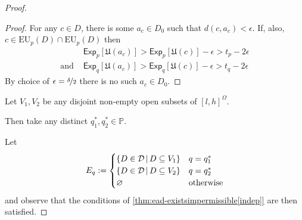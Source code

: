 \documentclass[a4paper,final]{article}
\newcommand\A{\mathcal{A}}
\renewcommand\P{\mathbb{P}} %
\newcommand\Exp{\mathsf{Exp}}
\newcommand\EU{\mathrm{EU}}
\newcommand\U{\mathfrak{U}} %
\newcommand{\Decs}{\mathcal{D}}
\newcommand{\IP}{\P}
\newcommand\SetDelimiter[1][]{
	\nonscript\,#1\vert \allowbreak \nonscript\,\mathopen{}}
\providecommand\given{\SetDelimiter}
\renewcommand{\emptyset}{\varnothing}
\renewcommand{\leq}{\leqslant}
\newenvironment{CCM rewritten}
{\begingroup\color{blue}} %
{\endgroup}              %
\begin{document}
\begin{proof}
\begin{proof}
		For any $c\in D$, there is some $a_c\in D_0$ such that $d(c,a_c)<\epsilon$. If, also,  $c\in \EU_{p}(D)\cap\EU_{p}(D)$ then 
		\begin{align}
			&\Exp_{p}[\U(a_c)]>\Exp_{p}[\U(c)]-\epsilon>t_p-2\epsilon\\
			\text{and }&\Exp_{q}[\U(a_c)]>\Exp_{q}[\U(c)]-\epsilon>t_q-2\epsilon
		\end{align}
		By choice of $\epsilon=\nicefrac{\delta}{2}$ there is no such $a_c\in D_0$. 
	\end{proof}
	
	Let $V_1,V_2$ be any disjoint non-empty open subsets of $[l,h]^\Omega$. 
	
	Then take any distinct $q^*_1,q^*_2\in\IP$. 
	
	Let $$E_q:=\begin{cases}
		\{D\in\Decs\given D\subseteq V_1\}&q=q^*_1\\
			\{D\in\Decs\given D\subseteq V_2\}&q=q^*_2\\
		\emptyset&\text{otherwise}
	\end{cases}$$
	and observe that the conditions of \cref{thm:ead-existsimpermissible[indep]} are then satisfied. 
\end{proof}
\end{document}
